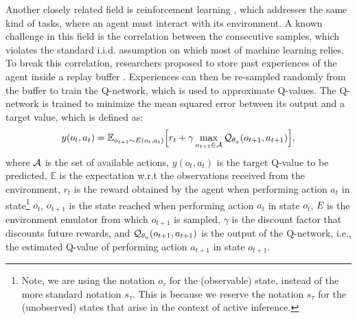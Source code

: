 \documentclass[twoside,11pt]{article}
\let\oldmathcal\mathcal
\renewcommand{\mathcal}[1]{%
  \IfSubStr{ABCDEFGHIJKLMNOPQRSTUVWXYZ}{#1}{\oldmathcal{#1}}{\mathdutchcal{#1}}
}
\begin{document}
Another closely related field is reinforcement learning \citep{DeepRL,DDQN,lample2016playing}, which addresses the same kind of tasks, where an agent must interact with its environment. A known challenge in this field is the correlation between the consecutive samples, which violates the standard i.i.d. assumption on which most of machine learning relies. To break this correlation, researchers proposed to store past experiences of the agent inside a replay buffer \citep{DeepRL}. Experiences can then be re-sampled randomly from the buffer to train the Q-network, which is used to approximate Q-values. The Q-network is trained to minimize the mean squared error between its output and a target value, which is defined as:
$$y(o_t,a_t) = \mathbb{E}_{o_{t+1} \sim E(o_t,a_t)}\Big[ r_t + \gamma \max_{a_{t+1} \in \mathcal{A}} \mathcal{Q}_{\theta_a}(o_{t+1}, a_{t+1})\Big],$$
where $\mathcal{A}$ is the set of available actions, $y(o_t,a_t)$ is the target Q-value to be predicted, $\mathbb{E}$ is the expectation w.r.t the observations received from the environment, $r_t$ is the reward obtained by the agent when performing action $a_t$ in state\footnote{Note, we are using the notation $o_\tau$ for the (observable) state, instead of the more standard notation $s_\tau$. This is because we reserve the notation $s_\tau$ for the (unobserved) states that arise in the context of active inference.} $o_t$, $o_{t+1}$ is the state reached when performing action $a_t$ in state $o_t$, $E$ is the environment emulator from which $o_{t+1}$ is sampled, $\gamma$ is the discount factor that discounts future rewards, and $\mathcal{Q}_{\theta_a}(o_{t+1}, a_{t+1})$ is the output of the Q-network, i.e., the estimated Q-value of performing action $a_{t+1}$ in state $o_{t+1}$.
\end{document}

